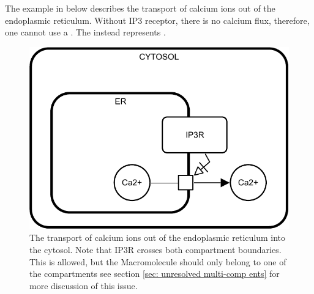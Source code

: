 The example in  below describes the transport of calcium ions out of the endoplasmic reticulum. Without IP3 receptor, there is no calcium flux, therefore, one cannot use a .
The  instead represents .

\begin{figure}[H]
  \centering
  \includegraphics[scale = 0.8]{examples/necessary_stim-transport}
  \caption{The transport of calcium ions out of the endoplasmic reticulum into the cytosol. Note that IP3R crosses both compartment boundaries. This is allowed, but the Macromolecule should only belong to one of the compartments see section \ref{sec: unresolved multi-comp ents} for more discussion of this issue.}
  \label{fig:necessary_stim-calcium}
\end{figure}

